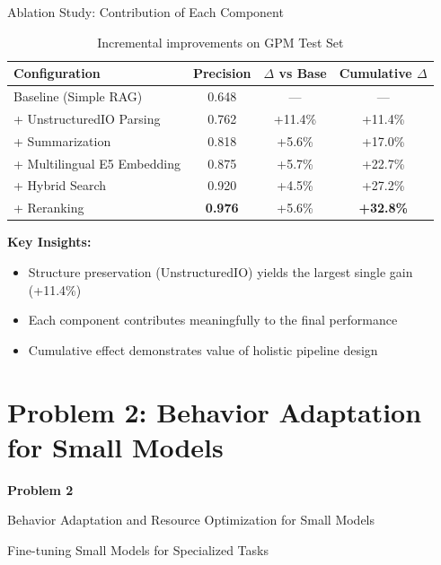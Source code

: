 \documentclass[11pt, aspectratio=169, xcolor=table]{beamer}
\begin{document}
\begin{frame}{Ablation Study: Contribution of Each Component}
    \begin{table}[H]
        \centering
        \caption{Incremental improvements on GPM Test Set}
        \small
        \begin{tabular}{|l|c|c|c|}
            \hline
            \textbf{Configuration} & \textbf{Precision} & \textbf{$\Delta$ vs Base} & \textbf{Cumulative $\Delta$} \\
            \hline
            Baseline (Simple RAG) & 0.648 & --- & --- \\
            \hline
            + UnstructuredIO Parsing & 0.762 & +11.4\% & +11.4\% \\
            \hline
            + Summarization & 0.818 & +5.6\% & +17.0\% \\
            \hline
            + Multilingual E5 Embedding & 0.875 & +5.7\% & +22.7\% \\
            \hline
            + Hybrid Search & 0.920 & +4.5\% & +27.2\% \\
            \hline
            + Reranking & \textbf{0.976} & +5.6\% & \textbf{+32.8\%} \\
            \hline
        \end{tabular}
    \end{table}

    \textbf{Key Insights:}
    \begin{itemize}
        \item Structure preservation (UnstructuredIO) yields the largest single gain (+11.4\%)
        \item Each component contributes meaningfully to the final performance
        \item Cumulative effect demonstrates value of holistic pipeline design
    \end{itemize}
\end{frame}


\section{Problem 2: Behavior Adaptation for Small Models}

\begin{frame}[plain]
    \begin{center}
        \vfill
        {\Huge\color{MainNavy}\textbf{Problem 2}}
        \vspace{0.5cm}
        
        {\Large Behavior Adaptation and Resource Optimization for Small Models}
        \vspace{0.3cm}
        
        {\large Fine-tuning Small Models for Specialized Tasks}
        \vfill
    \end{center}
\end{frame}
\end{document}
